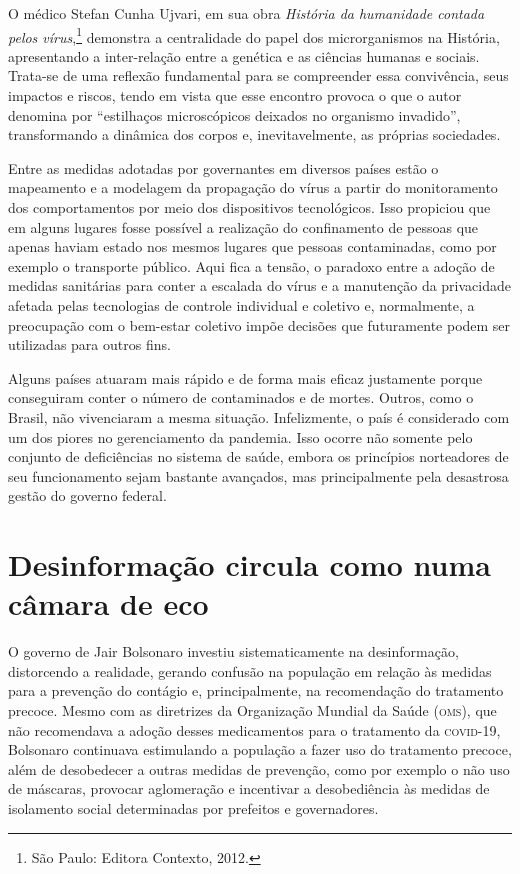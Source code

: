 O médico Stefan Cunha Ujvari, em sua obra \textit{História da
humanidade contada pelos vírus},\footnote{São Paulo:
Editora Contexto, 2012.} demonstra a centralidade do papel dos
microrganismos na História, apresentando a inter-relação entre a
genética e as ciências humanas e sociais. Trata-se de uma reflexão
fundamental para se compreender essa convivência, seus impactos e
riscos, tendo em vista que esse encontro provoca o que o autor denomina
por ``estilhaços microscópicos deixados no organismo invadido'',
transformando a dinâmica dos corpos e, inevitavelmente, as próprias
sociedades.

Entre as medidas adotadas por governantes em diversos países estão o
mapeamento e a modelagem da propagação do vírus a partir do
monitoramento dos comportamentos por meio dos dispositivos tecnológicos.
Isso propiciou que em alguns lugares fosse possível a realização do
confinamento de pessoas que apenas haviam estado nos mesmos lugares que
pessoas contaminadas, como por exemplo o transporte público. Aqui fica a
tensão, o paradoxo entre a adoção de medidas sanitárias para conter a
escalada do vírus e a manutenção da privacidade afetada pelas
tecnologias de controle individual e coletivo e, normalmente, a
preocupação com o bem-estar coletivo impõe decisões que futuramente
podem ser utilizadas para outros fins.

Alguns países atuaram mais rápido e de forma mais eficaz justamente
porque conseguiram conter o número de contaminados e de mortes. Outros,
como o Brasil, não vivenciaram a mesma situação. Infelizmente, o país é
considerado com um dos piores no gerenciamento da pandemia. Isso ocorre
não somente pelo conjunto de deficiências no sistema de saúde, embora os
princípios norteadores de seu funcionamento sejam bastante avançados,
mas principalmente pela desastrosa gestão do governo federal.

\section{Desinformação circula como numa câmara de eco}

O governo de Jair Bolsonaro investiu sistematicamente na desinformação,
distorcendo a realidade, gerando confusão na população em relação às
medidas para a prevenção do contágio e, principalmente, na recomendação
do tratamento precoce. Mesmo com as diretrizes da Organização Mundial da
Saúde (\textsc{oms}), que não recomendava a adoção desses medicamentos para o
tratamento da \textsc{covid-19}, Bolsonaro continuava estimulando a população a
fazer uso do tratamento precoce, além de desobedecer a outras medidas de
prevenção, como por exemplo o não uso de máscaras, provocar aglomeração
e incentivar a desobediência às medidas de isolamento social
determinadas por prefeitos e governadores.

